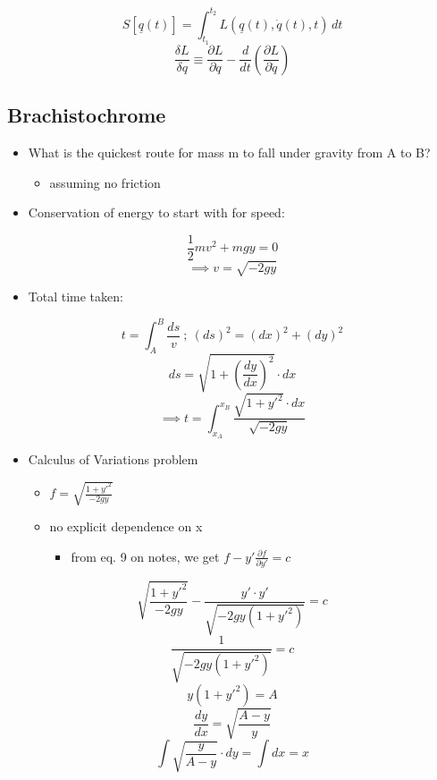 \documentclass[a4paper,11pt,normalem]{article}
\begin{document}
\[
    S[\underline{q}(t)] = \int_{t_1}^{t_2} L(\underline{q}(t), \dot{q}(t), t)\,dt \]
\[
    \frac{\delta L}{\delta q} \equiv \frac{\partial L}{\partial q} - \frac{d}{dt}(\frac{\partial L}{\partial \dot{q}})
\]

\subsection{Brachistochrome}\label{brachistochrome}

\begin{itemize}
\item
  What is the quickest route for mass m to fall under gravity from A to
  B?
  \begin{itemize}
  \item
    assuming no friction
  \end{itemize}
\item
  Conservation of energy to start with for speed:
\end{itemize}

\[
    \frac{1}{2}mv^2 + mgy = 0 \] \[
    \implies v = \sqrt{-2gy} \] \[
\]

\begin{itemize}
\item
  Total time taken:
\end{itemize}

\[
    t = \int_{A}^{B} \frac{ds}{v} ~;~ (ds)^2 = (dx)^2 + (dy)^2 \] \[
    ds = \sqrt{1 + (\frac{dy}{dx})^2} \cdot dx \] \[
    \implies t = \int_{x_{A}}^{x_{B}} \frac{\sqrt{1 + y'^{2}} \cdot dx}{\sqrt{-2gy}}
\]

\begin{itemize}
\item
  Calculus of Variations problem
  \begin{itemize}
  \item
    \(f = \sqrt{\frac{1 + y'^2}{-2gy}}\)
  \item
    no explicit dependence on x
    \begin{itemize}
    \item
      from eq. 9 on notes, we get
      \(f - y'\frac{\partial f}{\partial y'} = c\)
    \end{itemize}
  \end{itemize}
\end{itemize}

\[
    \sqrt{\frac{1 + y'^2}{-2gy}} - \frac{y' \cdot y'}{\sqrt{-2gy(1 + y'^2)}} = c \]
\[
    \frac{1}{\sqrt{-2gy(1 + y'^2)}} = c \] \[
    y(1 + y'^2) = A \] \[
    \frac{dy}{dx} = \sqrt{\frac{A - y}{y}} \] \[
    \int \sqrt{\frac{y}{A - y}} \cdot dy = \int dx = x
\]
\end{document}

